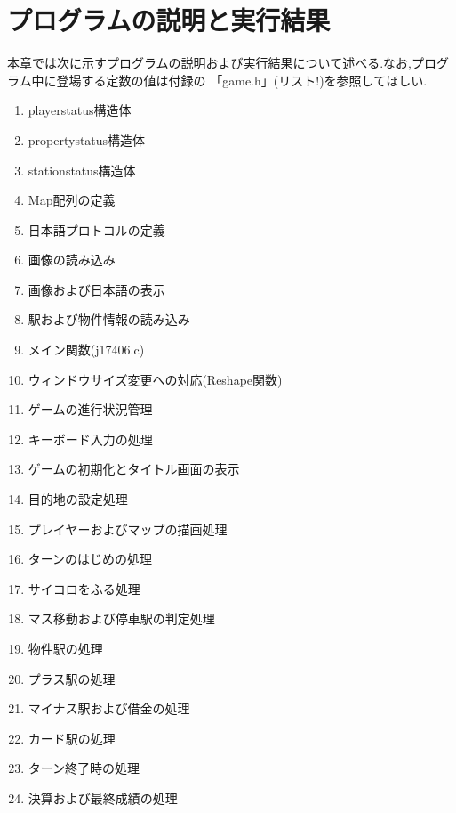 \documentclass[a4j]{jarticle}
\begin{document}
    \section{プログラムの説明と実行結果}
    本章では次に示すプログラムの説明および実行結果について述べる.なお,プログラム中に登場する定数の値は付録の
    「game.h」(リスト!)を参照してほしい.
    \begin{enumerate}
        \item playerstatus構造体
        \item propertystatus構造体
        \item stationstatus構造体
        \item Map配列の定義
        \item 日本語プロトコルの定義
        \item 画像の読み込み
        \item 画像および日本語の表示
        \item 駅および物件情報の読み込み
        \item メイン関数(j17406.c)
        \item ウィンドウサイズ変更への対応(Reshape関数)
        \item ゲームの進行状況管理
        \item キーボード入力の処理
        \item ゲームの初期化とタイトル画面の表示
        \item 目的地の設定処理
        \item プレイヤーおよびマップの描画処理
        \item ターンのはじめの処理
        \item サイコロをふる処理
        \item マス移動および停車駅の判定処理
        \item 物件駅の処理
        \item プラス駅の処理
        \item マイナス駅および借金の処理
        \item カード駅の処理
        \item ターン終了時の処理
        \item 決算および最終成績の処理
    \end{enumerate}    
\end{document}
